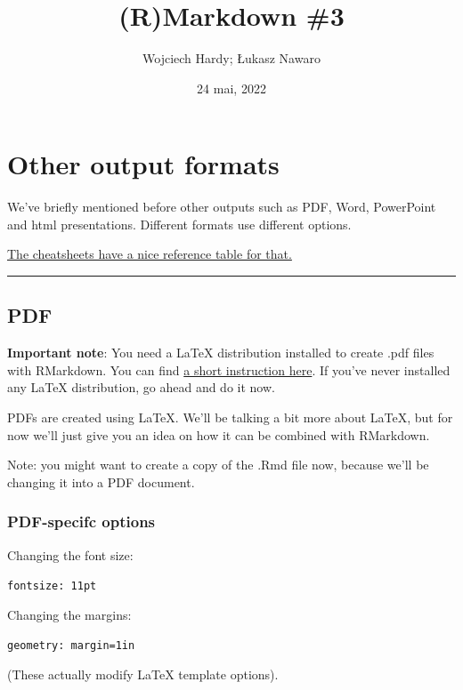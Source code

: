 \documentclass[
  11pt,
]{article}
\title{(R)Markdown \#3}
\author{Wojciech Hardy; Łukasz Nawaro}
\date{24 mai, 2022}
\begin{document}
\maketitle

{
\setcounter{tocdepth}{3}
\tableofcontents
}
\hypertarget{other-output-formats}{%
\section{Other output formats}\label{other-output-formats}}

We've briefly mentioned before other outputs such as PDF, Word,
PowerPoint and html presentations. Different formats use different
options.

\href{https://www.rstudio.com/wp-content/uploads/2015/03/rmarkdown-reference.pdf}{The
cheatsheets have a nice reference table for that.}

\begin{center}\rule{0.5\linewidth}{0.5pt}\end{center}

\hypertarget{pdf}{%
\subsection{PDF}\label{pdf}}

\textbf{Important note}: You need a LaTeX distribution installed to
create .pdf files with RMarkdown. You can find
\href{https://bookdown.org/yihui/rmarkdown-cookbook/install-latex.html}{a
short instruction here}. If you've never installed any LaTeX
distribution, go ahead and do it now.

PDFs are created using LaTeX. We'll be talking a bit more about LaTeX,
but for now we'll just give you an idea on how it can be combined with
RMarkdown.

Note: you might want to create a copy of the .Rmd file now, because
we'll be changing it into a PDF document.

\hypertarget{pdf-specifc-options}{%
\subsubsection{PDF-specifc options}\label{pdf-specifc-options}}

Changing the font size:

\texttt{fontsize:\ 11pt}

Changing the margins:

\texttt{geometry:\ margin=1in}

(These actually modify LaTeX template options).
\end{document}
